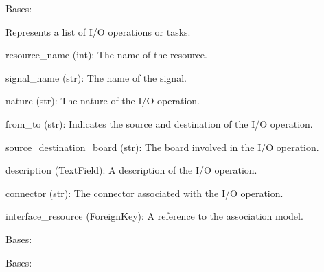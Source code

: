 \documentclass[letterpaper,10pt,english]{sphinxmanual}
\begin{document}

\begin{fulllineitems}
\label{\detokenize{app:app.models.IO_list}}
\pysigstartsignatures
{}
\pysigstopsignatures
\sphinxAtStartPar
Bases: 

\sphinxAtStartPar
Represents a list of I/O operations or tasks.
\begin{description}
\sphinxAtStartPar
resource\_name (int): The name of the resource.

\sphinxAtStartPar
signal\_name (str): The name of the signal.

\sphinxAtStartPar
nature (str): The nature of the I/O operation.

\sphinxAtStartPar
from\_to (str): Indicates the source and destination of the I/O operation.

\sphinxAtStartPar
source\_destination\_board (str): The board involved in the I/O operation.

\sphinxAtStartPar
description (TextField): A description of the I/O operation.

\sphinxAtStartPar
connector (str): The connector associated with the I/O operation.

\sphinxAtStartPar
interface\_resource (ForeignKey): A reference to the association model.

\end{description}

\begin{fulllineitems}
\label{\detokenize{app:app.models.IO_list.DoesNotExist}}
\pysigstartsignatures
{}
\pysigstopsignatures
\sphinxAtStartPar
Bases: 

\end{fulllineitems}


\begin{fulllineitems}
\label{\detokenize{app:app.models.IO_list.MultipleObjectsReturned}}
\pysigstartsignatures
{}
\pysigstopsignatures
\sphinxAtStartPar
Bases: 


\end{fulllineitems}
\end{fulllineitems}
\end{document}
